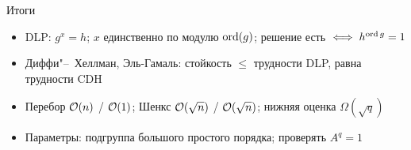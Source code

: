\documentclass{ca-slides}
\begin{document}
\begin{canvasframe}{Итоги}
  \begin{itemize}
    \item DLP: $g^x = h$; $x$ единственно по модулю $\operatorname{ord}(g)$; решение есть $\iff h^{\operatorname{ord} g} = 1$
    \item Диффи"--~Хеллман, Эль-Гамаль: стойкость $\le$ трудности DLP, равна трудности CDH
    \item Перебор $\mathcal{O}(n)$ / $\mathcal{O}(1)$; Шенкс $\mathcal{O}(\sqrt n)$ / $\mathcal{O}(\sqrt n)$;
      нижняя оценка $\Omega(\sqrt q)$
    \item Параметры: подгруппа большого простого порядка; проверять $A^q = 1$
  \end{itemize}
  \notearea[0.3\textheight]
\end{canvasframe}
\end{document}
